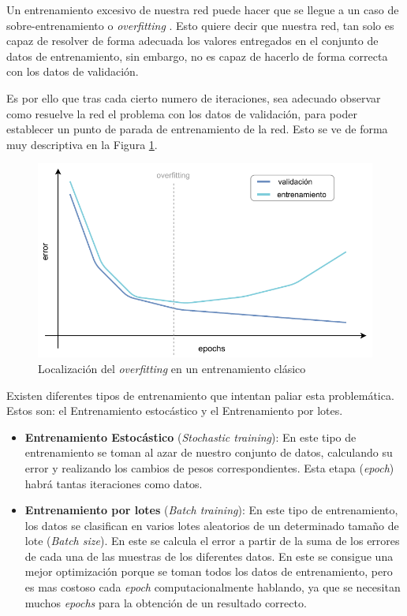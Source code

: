 Un entrenamiento excesivo de nuestra red puede hacer que se llegue a un caso de sobre-entrenamiento o \textit{overfitting} \cite{salman2019overfitting}. Esto quiere decir que nuestra red, tan solo es capaz de resolver de forma adecuada los valores entregados en el conjunto de datos de entrenamiento, sin embargo, no es capaz de hacerlo de forma correcta con los datos de validación.

Es por ello que tras cada cierto numero de iteraciones, sea adecuado observar como resuelve la red el problema con los datos de validación, para poder establecer un punto de parada de entrenamiento de la red. Esto se ve de forma muy descriptiva en la Figura \ref{fig:overfitting}.

\begin{figure}[!h]
    \centering
    \includegraphics[width=1\textwidth]{figuras/desarrollo teorico/overfitting.pdf}
    \caption{Localización del \textit{overfitting} en un entrenamiento clásico}
    \label{fig:overfitting}
    \end{figure}

Existen diferentes tipos de entrenamiento que intentan paliar esta problemática. Estos son: el Entrenamiento estocástico y el Entrenamiento por lotes.

\begin{itemize}
    \item \textbf{Entrenamiento Estocástico} (\textit{Stochastic training}): En este tipo de entrenamiento se toman al azar de nuestro conjunto de datos, calculando su error y realizando los cambios de pesos correspondientes. Esta etapa (\textit{epoch}) habrá tantas iteraciones como datos.
    
    \item \textbf{Entrenamiento por lotes} (\textit{Batch training}): En este tipo de entrenamiento, los datos se clasifican en varios lotes aleatorios de un determinado tamaño de lote (\textit{Batch size}). En este se calcula el error a partir de la suma de los errores de cada una de las muestras de los diferentes datos. En este se consigue una mejor optimización porque se toman todos los datos de entrenamiento, pero es mas costoso cada \textit{epoch} computacionalmente hablando, ya que se necesitan muchos \textit{epochs} para la obtención de un resultado correcto.
\end{itemize}


